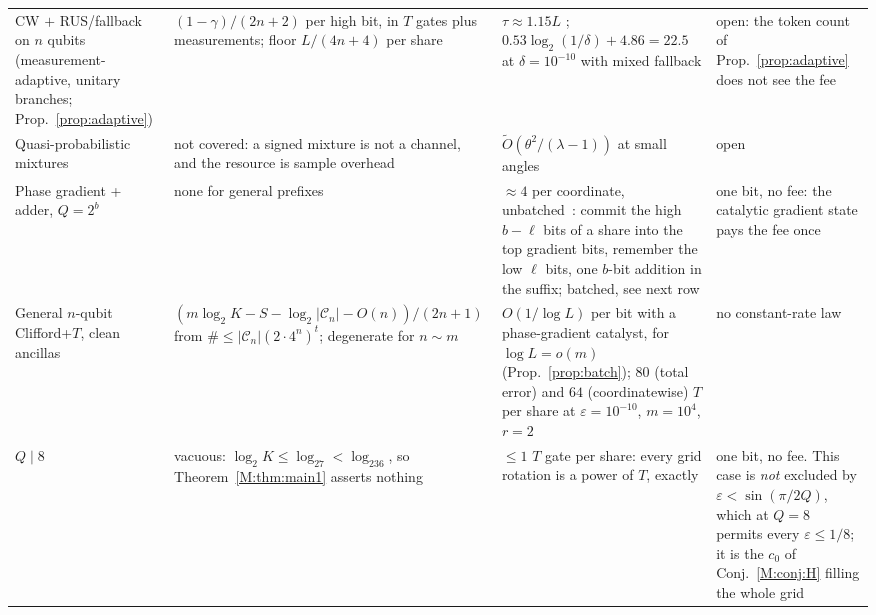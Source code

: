 \documentclass[aps,prx,twocolumn,superscriptaddress,nofootinbib,longbibliography]{revtex4-2}
\theoremstyle{plain}
\theoremstyle{definition}
\theoremstyle{remark}
\begin{document}
\begin{table}[t]
\begin{tabular}{@{}p{3.6cm} p{5.2cm} p{4.6cm} p{3.4cm}@{}}
\raggedright CW $+$ RUS/fallback on $n$ qubits (measurement-adaptive, unitary branches; Prop.~\ref{prop:adaptive}) & \raggedright $(1-\gamma)/(2n+2)$ per high bit, in $T$ gates plus measurements; floor $L/(4n+4)$ per share & \raggedright $\tau\approx1.15L$ \cite{BRS}; $0.53\log_2(1/\delta)+4.86=22.5$ at $\delta=10^{-10}$ with mixed fallback \cite{KLMPP,Bothe} & \raggedright open: the token count of Prop.~\ref{prop:adaptive} does not see the fee\tabularnewline
\raggedright Quasi-probabilistic mixtures \cite{Bothe} & \raggedright not covered: a signed mixture is not a channel, and the resource is sample overhead & \raggedright $\tilde O(\theta^2/(\lambda-1))$ at small angles \cite{Bothe} & \raggedright open\tabularnewline
\raggedright Phase gradient + adder, $Q=2^b$ & \raggedright none for general prefixes & \raggedright $\approx4$ per coordinate, unbatched~\cite{Gidney}: commit the high $b-\ell$ bits of a share into the top gradient bits, remember the low $\ell$ bits, one $b$-bit addition in the suffix; batched, see next row & \raggedright one bit, no fee: the catalytic gradient state pays the fee once\tabularnewline
\raggedright General $n$-qubit Clifford+$T$, clean ancillas & \raggedright $(m\log_2K-S-\log_2|\mathcal C_n|-O(n))/(2n+1)$ from $\#\le|\mathcal C_n|(2\cdot4^n)^t$; degenerate for $n\sim m$ & \raggedright $O(1/\log L)$ per bit with a phase-gradient catalyst, for $\log L=o(m)$ (Prop.~\ref{prop:batch}); $80$ (total error) and $64$ (coordinatewise) $T$ per share at $\varepsilon=10^{-10}$, $m=10^4$, $r=2$ & \raggedright no constant-rate law\tabularnewline
\raggedright $Q\mid8$ & \raggedright vacuous: $\log_2K\le\log_27<\log_236$, so Theorem~\ref{M:thm:main1} asserts nothing & \raggedright $\le1$ $T$ gate per share: every grid rotation is a power of $T$, exactly & \raggedright one bit, no fee. This case is \emph{not} excluded by $\varepsilon<\sin(\pi/2Q)$, which at $Q=8$ permits every $\varepsilon\le1/8$; it is the $c_0$ of Conj.~\ref{M:conj:H} filling the whole grid\tabularnewline
\bottomrule
\end{tabular}
\end{table}
\end{document}
